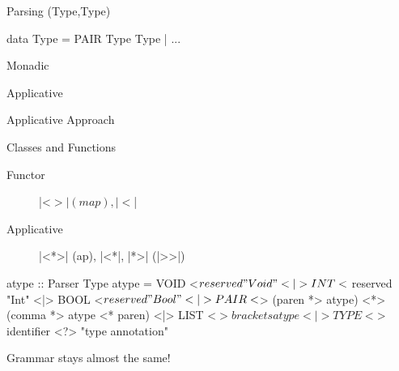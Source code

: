 \begin{frame}[fragile]{Parsing (Type,Type)}
    \begin{HASKELL}
      data Type = PAIR Type Type | ...
    \end{HASKELL}

  \begin{block}{Monadic}
  \end{block}

  \pause
  \begin{block}{Applicative}
  \end{block}

\end{frame}

\begin{frame}[fragile]{Applicative Approach}

  \begin{block}{Classes and Functions}
    \begin{description}
      \item[Functor]     |<$>| (map), |<$|
      \item[Applicative] |<*>| (ap), |<*|, |*>| (|>>|)
    \end{description}
  \end{block}

  \pause
    \begin{HASKELL}
      atype :: Parser Type
      atype =   VOID <$  reserved "Void"
            <|> INT  <$  reserved "Int"
            <|> BOOL <$  reserved "Bool"
            <|> PAIR <$> (paren *> atype)
                     <*> (comma *> atype <* paren)
            <|> LIST <$> brackets atype
            <|> TYPE <$> identifier
            <?> "type annotation"
    \end{HASKELL}

  \pause

  Grammar stays almost the same!

\end{frame}

